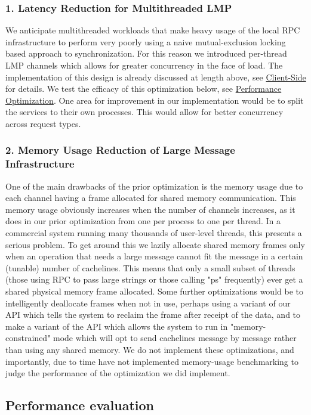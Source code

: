 \subsubsection{1. Latency Reduction for Multithreaded LMP}
We anticipate multithreaded workloads that make heavy usage of the local RPC infrastructure to perform
very poorly using a naive mutual-exclusion locking based approach to synchronization. For this reason we
introduced per-thread LMP channels which allows for greater concurrency in the face of load. The implementation
of this design is already discussed at length above, see \hyperref[sec:clientside]{Client-Side} for details. We test
the efficacy of this optimization below, see \hyperref[sec:performance-opt]{Performance Optimization}. One area for improvement
in our implementation would be to split the services to their own processes. This would allow for better concurrency
across request types.
\subsubsection{2. Memory Usage Reduction of Large Message Infrastructure}
One of the main drawbacks of the prior optimization is the memory usage due to each channel having a frame allocated for shared memory communication. 
This memory usage obviously increases when the number of channels increases, as it does in our prior optimization from one per process
to one per thread. In a commercial system running many thousands of user-level threads, this presents a serious problem. To get around this
we lazily allocate shared memory frames only when an operation that needs a large message cannot fit the message in a certain (tunable) number 
of cachelines. This means that only a small subset of threads (those using RPC to pass large strings or those calling "ps" frequently) ever get
a shared physical memory frame allocated. Some further optimizations would be to intelligently deallocate frames when not in use, perhaps
using a variant of our  API which tells the system to reclaim the frame after receipt of the data, and to make a variant
of the API which allows the system to run in "memory-constrained" mode which will opt to send cachelines message by message rather than
using any shared memory. We do not implement these optimizations, and importantly, due to time have not implemented memory-usage benchmarking
to judge the performance of the optimization we did implement.

\subsection{Performance evaluation}
\label{sec:performance-opt}
